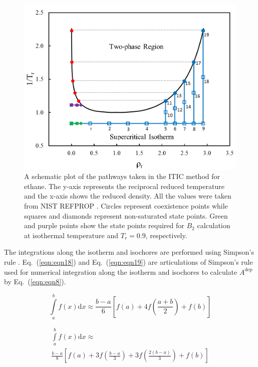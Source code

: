 \documentclass[5p,times]{elsarticle}
\begin{document}
\begin{figure}
\includegraphics[scale=0.5]{Figures/ITIC-pathway-C2.png}
\caption{A schematic plot of the pathways taken in the ITIC method for ethane. The y-axis represents the reciprocal reduced temperature and the x-axis shows the reduced density. All the values were taken from NIST REFPROP \cite{Bucker2006}. Circles represent coexistence points while squares and diamonds represent non-saturated state points. Green and purple points show the state points required for $B_2$ calculation at isothermal temperature and $T_r=0.9$, respectively. }
\label{fig:ITICpathway}
\end{figure}

The integrations along the isotherm and isochores are performed using Simpson's rule \cite{atkinson2008}. Eq.~(\ref{eqn:eqn18}) and Eq.~(\ref{eqn:eqn19}) are
articulations of Simpson's rule used for numerical integration along the isotherm and isochores to calculate $A^{\mathrm{dep}}$ by Eq.~(\ref{eqn:eqn8}).

\begin{equation}
\int\limits_a^b {f(x)\mathrm{d} x \approx \frac{{b - a}}{6}} \left[ {f(a) + 4f \left( \frac{{a + b}}{2} \right) + f(b)} \right] \label{eqn:eqn18}
\end{equation}

\begin{equation}
\begin{array}{l}
{\int\limits_a^b f(x)\mathrm{d}x \approx }
\\ 
{{\frac{{b - a}}{8} \left[ {f(a) + 3f \left( \frac{{b - a}}{3} \right) + 3f \left( \frac{{2(b - a)}}{3} \right) + f(b)} \right]}}  
\end{array}
\label{eqn:eqn19}
\end{equation}
\end{document}
